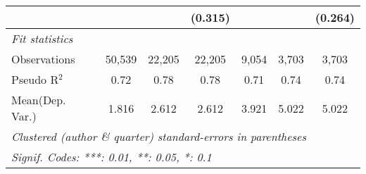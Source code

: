 \begin{tabular}{lcccccc}
                           &              &         & (0.315) &              &         & (0.264)\\   
   \midrule
   \emph{Fit statistics}\\
   Observations            & 50,539       & 22,205  & 22,205  & 9,054        & 3,703   & 3,703\\  
   Pseudo R$^2$            & 0.72         & 0.78    & 0.78    & 0.71         & 0.74    & 0.74\\  
Mean(Dep. Var.) & 1.816 & 2.612 & 2.612 & 3.921 & 5.022 & 5.022 \\
   \midrule \midrule
   \multicolumn{7}{l}{\emph{Clustered (author \& quarter) standard-errors in parentheses}}\\
   \multicolumn{7}{l}{\emph{Signif. Codes: ***: 0.01, **: 0.05, *: 0.1}}\\
\end{tabular}
\par\endgroup
